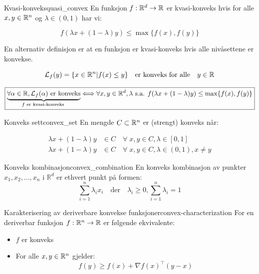 \begin{remark}{Kvasi-konveks}{quasi_convex}
	En funksjon \(f: \mathbb{R}^d \to \mathbb{R}\) er kvasi-konveks hvis for alle \(x, y \in \mathbb{R}^n\) og \(\lambda \in (0, 1)\) har vi:

	\[
		f(\lambda x + (1 - \lambda)y) \leq \max\{f(x), f(y)\}
	\]

	En alternativ definisjon er at en funksjon er kvasi-konveks hvis alle nivåsettene er konvekse.

	\[
		\mathcal{L}_f(y) = \{x \in \mathbb{R}^n | f(x) \leq y\} \quad \text{er konveks for alle} \quad y \in \mathbb{R}
	\]

	\[
		\boxed{\underbrace{\forall \alpha \in \mathbb{R}, \mathcal{L}_f(\alpha) \text{ er konveks}}_{f \text{ er kvasi-konveks }}\Longleftrightarrow \forall x, y \in \mathbb{R}^d,\lambda \text{ s.a. } f(\lambda x + (1-\lambda)y) \leq \max \{ f(x), f(y) \}}
	\]
\end{remark}

\begin{definition}{Konveks sett}{convex_set}
	En mengde \(C \subset \mathbb{R}^n\) er (strengt) konveks når:

	\begin{align*}
		\lambda x + (1 - \lambda)y & \in C \quad \forall \; x, y \in C, \lambda \in [0, 1] \tag{Konveks}                   \\
		\lambda x + (1 - \lambda)y & \in C \quad \forall \; x, y \in C, \lambda \in (0, 1), x \neq y \tag{Strengt konveks}
	\end{align*}

\end{definition}

\begin{definition}{Konveks kombinasjon}{convex_combination}
	En konveks kombinasjon av punkter $x_1, x_2, \ldots, x_n$ i $\mathbb{R}^d$ er ethvert punkt på formen:
	\[
		\sum_{i=1}^n \lambda_i x_i \quad \text{der} \quad \lambda_i \geq 0, \sum_{i=1}^n \lambda_i = 1
	\]
\end{definition}

\begin{remark}{Karakterisering av deriverbare konvekse funksjoner}{convex-characterization}
	For en deriverbar funksjon  \(f: \mathbb{R}^n \to \mathbb{R}\) er følgende ekvivalente:
	\begin{itemize}
		\item  \(f\) er konveks
		\item For alle  \(x, y \in \mathbb{R}^n\) gjelder:
		      \[
			      f(y) \geq f(x) + \nabla f(x)^\top (y - x)
		      \]
	\end{itemize}
\end{remark}

